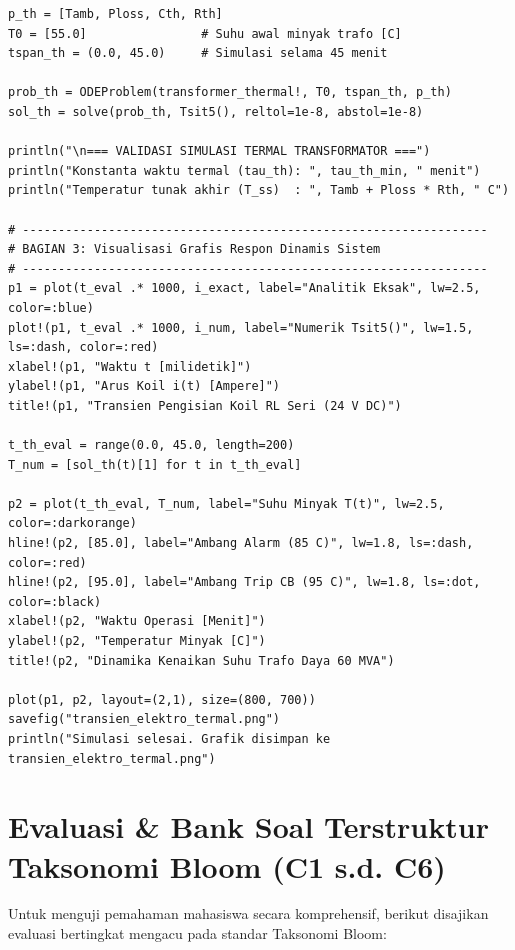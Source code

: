 \documentclass[11pt,a4paper]{article}
\theoremstyle{definition}
\begin{document}
\begin{lstlisting}[style=juliastyle, caption={Skrip Julia untuk Pemodelan Transien Elektromagnetik dan Dinamika Termal Trafo.}, label={lst:julia_transient_sim}]
p_th = [Tamb, Ploss, Cth, Rth]
T0 = [55.0]                # Suhu awal minyak trafo [C]
tspan_th = (0.0, 45.0)     # Simulasi selama 45 menit

prob_th = ODEProblem(transformer_thermal!, T0, tspan_th, p_th)
sol_th = solve(prob_th, Tsit5(), reltol=1e-8, abstol=1e-8)

println("\n=== VALIDASI SIMULASI TERMAL TRANSFORMATOR ===")
println("Konstanta waktu termal (tau_th): ", tau_th_min, " menit")
println("Temperatur tunak akhir (T_ss)  : ", Tamb + Ploss * Rth, " C")

# -----------------------------------------------------------------
# BAGIAN 3: Visualisasi Grafis Respon Dinamis Sistem
# -----------------------------------------------------------------
p1 = plot(t_eval .* 1000, i_exact, label="Analitik Eksak", lw=2.5, color=:blue)
plot!(p1, t_eval .* 1000, i_num, label="Numerik Tsit5()", lw=1.5, ls=:dash, color=:red)
xlabel!(p1, "Waktu t [milidetik]")
ylabel!(p1, "Arus Koil i(t) [Ampere]")
title!(p1, "Transien Pengisian Koil RL Seri (24 V DC)")

t_th_eval = range(0.0, 45.0, length=200)
T_num = [sol_th(t)[1] for t in t_th_eval]

p2 = plot(t_th_eval, T_num, label="Suhu Minyak T(t)", lw=2.5, color=:darkorange)
hline!(p2, [85.0], label="Ambang Alarm (85 C)", lw=1.8, ls=:dash, color=:red)
hline!(p2, [95.0], label="Ambang Trip CB (95 C)", lw=1.8, ls=:dot, color=:black)
xlabel!(p2, "Waktu Operasi [Menit]")
ylabel!(p2, "Temperatur Minyak [C]")
title!(p2, "Dinamika Kenaikan Suhu Trafo Daya 60 MVA")

plot(p1, p2, layout=(2,1), size=(800, 700))
savefig("transien_elektro_termal.png")
println("Simulasi selesai. Grafik disimpan ke transien_elektro_termal.png")
\end{lstlisting}

\section{Evaluasi \& Bank Soal Terstruktur Taksonomi Bloom (C1 s.d. C6)}

Untuk menguji pemahaman mahasiswa secara komprehensif, berikut disajikan evaluasi bertingkat mengacu pada standar Taksonomi Bloom:
\end{document}
